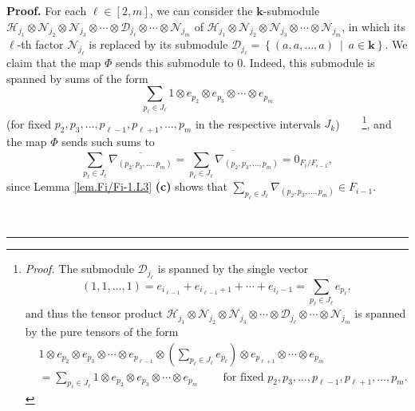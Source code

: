 \documentclass[numbers=enddot,12pt,final,onecolumn,notitlepage]{scrartcl}%
\theoremstyle{definition}
\newenvironment{proof}[1][Proof]{\noindent\textbf{#1.} }{\ \rule{0.5em}{0.5em}}
\let\sumnonlimits\sum
\renewcommand{\sum}{\sumnonlimits\limits}
\begin{document}
\begin{proof}
For each $\ell\in\left[  2,m\right]  $, we can consider the $\mathbf{k}%
$-submodule $\mathcal{H}_{j_{1}}\otimes\mathcal{N}_{j_{2}}\otimes
\mathcal{N}_{j_{3}}\otimes\cdots\otimes\mathcal{D}_{j_{\ell}}\otimes
\cdots\otimes\mathcal{N}_{j_{m}}$ of $\mathcal{H}_{j_{1}}\otimes
\mathcal{N}_{j_{2}}\otimes\mathcal{N}_{j_{3}}\otimes\cdots\otimes
\mathcal{N}_{j_{m}}$, in which its $\ell$-th factor $\mathcal{N}_{j_{\ell}}$
is replaced by its submodule $\mathcal{D}_{j_{\ell}}=\left\{  \left(
a,a,\ldots,a\right)  \ \mid\ a\in\mathbf{k}\right\}  $. We claim that the map
$\Phi$ sends this submodule to $0$. Indeed, this submodule is spanned by sums
of the form%
\[
\sum_{p_{\ell}\in J_{\ell}}1\otimes e_{p_{2}}\otimes e_{p_{3}}\otimes
\cdots\otimes e_{p_{m}}%
\]
(for fixed $p_{2},p_{3},\ldots,p_{\ell-1},p_{\ell+1},\ldots,p_{m}$ in the
respective intervals $J_{k}$)\ \ \ \ \footnote{\textit{Proof.} The submodule
$\mathcal{D}_{j_{\ell}}$ is spanned by the single vector
\[
\left(  1,1,\ldots,1\right)  =e_{i_{\ell-1}}+e_{i_{\ell-1}+1}+\cdots
+e_{i_{\ell}-1}=\sum_{p_{\ell}\in J_{\ell}}e_{p_{\ell}},
\]
and thus the tensor product $\mathcal{H}_{j_{1}}\otimes\mathcal{N}_{j_{2}%
}\otimes\mathcal{N}_{j_{3}}\otimes\cdots\otimes\mathcal{D}_{j_{\ell}}%
\otimes\cdots\otimes\mathcal{N}_{j_{m}}$ is spanned by the pure tensors of the
form%
\begin{align*}
&  1\otimes e_{p_{2}}\otimes e_{p_{3}}\otimes\cdots\otimes e_{p_{\ell-1}%
}\otimes\left(  \sum_{p_{\ell}\in J_{\ell}}e_{p_{\ell}}\right)  \otimes
e_{p_{\ell+1}}\otimes\cdots\otimes e_{p_{m}}\\
&  =\sum_{p_{\ell}\in J_{\ell}}1\otimes e_{p_{2}}\otimes e_{p_{3}}%
\otimes\cdots\otimes e_{p_{m}}\ \ \ \ \ \ \ \ \ \ \text{for fixed }p_{2}%
,p_{3},\ldots,p_{\ell-1},p_{\ell+1},\ldots,p_{m}.
\end{align*}
}, and the map $\Phi$ sends such sums to%
\[
\sum_{p_{\ell}\in J_{\ell}}\overline{\nabla_{\left(  p_{2},p_{3},\ldots
,p_{m}\right)  }}=\overline{\sum_{p_{\ell}\in J_{\ell}}\nabla_{\left(
p_{2},p_{3},\ldots,p_{m}\right)  }}=0_{F_{i}/F_{i-1}},
\]
since Lemma \ref{lem.Fi/Fi-1.L3} \textbf{(c)} shows that $\sum_{p_{\ell}\in
J_{\ell}}\nabla_{\left(  p_{2},p_{3},\ldots,p_{m}\right)  }\in F_{i-1}$.


\end{proof}
\end{document}
